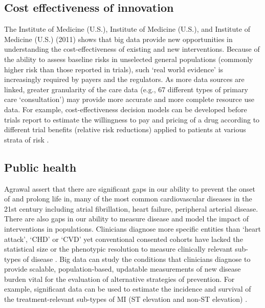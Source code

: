 \documentclass[sigconf]{acmart}
\begin{document}
\subsection{Cost effectiveness of innovation}
The Institute of Medicine (U.S.), Institute of Medicine (U.S.), and Institute of Medicine (U.S.) (2011) shows that big data provide new opportunities in understanding the cost-effectiveness of existing and new interventions. Because of the ability to assess baseline risks in unselected general populations (commonly higher risk than those reported in trials), such ‘real world evidence' is increasingly required by payers and the regulators. As more data sources are linked, greater granularity of the care data (e.g., 67 different types of primary care ‘consultation') may provide more accurate and more complete resource use data. For example, cost-effectiveness decision models can be developed before trials report to estimate the willingness to pay and pricing of a drug according to different trial benefits (relative risk reductions) applied to patients at various strata of risk \cite{muenke2015congenital}.

\subsection{Public health}
Agrawal \cite{agrawal1993mining} assert that there are significant gaps in our ability to prevent the onset of and prolong life in, many of the most common cardiovascular diseases in the 21st century including atrial fibrillation, heart failure, peripheral arterial disease. There are also gaps in our ability to measure disease and model the impact of interventions in populations. Clinicians diagnose more specific entities than ‘heart attack', ‘CHD' or ‘CVD' yet conventional consented cohorts have lacked the statistical size or the phenotypic resolution to measure clinically relevant sub-types of disease \cite{chu2009bayesian}. Big data can study the conditions that clinicians diagnose to provide scalable, population-based, updatable measurements of new disease burden vital for the evaluation of alternative strategies of prevention. For example, significant data can be used to estimate the incidence and survival of the treatment-relevant sub-types of MI (ST elevation and non-ST elevation) \cite{dietterich2000ensemble}.
\end{document}
